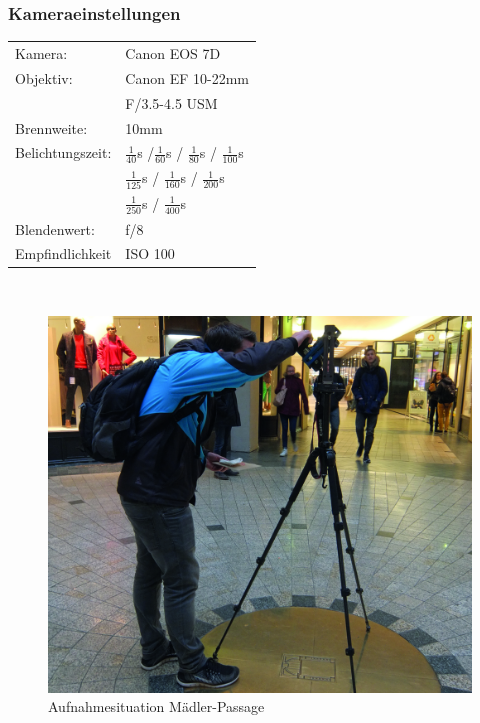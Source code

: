 \documentclass[liststotoc,bibtotoc,fontsize=14pt,]{scrreprt}
\begin{document}
			\subsubsection{Kameraeinstellungen}
			\begin{minipage}{0.58\textwidth}
				\begin{tabular}{ll}
					Kamera: &Canon EOS 7D \\
					Objektiv: &Canon EF 10-22mm \\
					& F/3.5-4.5 USM\\		
					Brennweite:& 10mm \\
					Belichtungszeit: &$\frac{1}{40}$s /$\frac{1}{60}$s / $\frac{1}{80}$s / $\frac{1}{100}$s \\
					&$\frac{1}{125}$s / $\frac{1}{160}$s / $\frac{1}{200}$s \\
					&$\frac{1}{250}$s / $\frac{1}{400}$s \\
					Blendenwert: & f/8\\
					Empfindlichkeit & ISO 100 \\
				\end{tabular}\\
			\end{minipage}%
			\begin{minipage}{0.42\textwidth}
				\begin{figure}[H]
					\includegraphics[width=\linewidth]{img/places/mae.jpg}
					\caption{Aufnahmesituation  Mädler-Passage}
					\label{img:ak}
				\end{figure}
			\end{minipage}%
			
\end{document}
